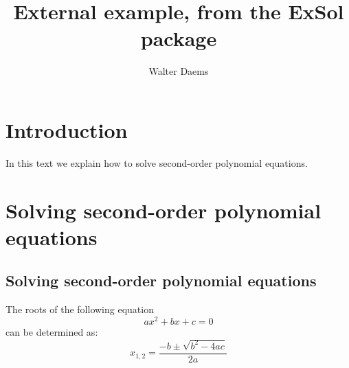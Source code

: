 \documentclass[a4paper,10pt]{article}
\title{External example, from the \textsf{ExSol} package}
\author{Walter Daems}
\begin{document}
\maketitle

\section{Introduction}

In this text we explain how to solve second-order polynomial
equations.

\section{Solving second-order polynomial equations}

\begin{informulacollectiononly}
\section*{Solving second-order polynomial equations}
\end{informulacollectiononly}
\begin{informulacollection}
  The roots of the following equation
  \begin{equation}
    a x^2 + bx + c = 0
  \end{equation}
  can be determined as:
  \begin{equation}
    x_{1,2} = \frac{-b \pm \sqrt{b^2 - 4 a c}}{2 a}
  \end{equation}
\end{informulacollection}
\end{document}
